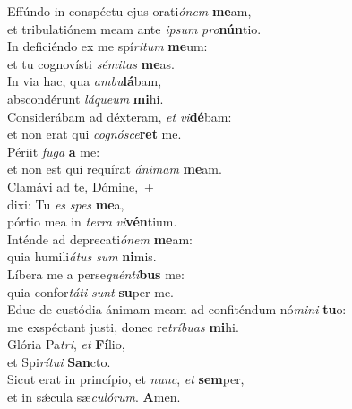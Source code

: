 \evenverse Effúndo in conspéctu ejus orati\textit{ó}\textit{nem} \textbf{me}am,~\*\\
\evenverse et tribulatiónem meam ante \textit{i}\textit{psum} \textit{pro}\textbf{nún}tio.\\
\oddverse In deficiéndo ex me spí\textit{ri}\textit{tum} \textbf{me}um:~\*\\
\oddverse et tu cognovísti \textit{sé}\textit{mi}\textit{tas} \textbf{me}as.\\
\evenverse In via hac, qua \textit{am}\textit{bu}\textbf{lá}bam,~\*\\
\evenverse abscondérunt \textit{lá}\textit{que}\textit{um} \textbf{mi}hi.\\
\oddverse Considerábam ad déxteram, \textit{et} \textit{vi}\textbf{dé}bam:~\*\\
\oddverse et non erat qui \textit{co}\textit{gnó}\textit{sce}\textbf{ret} me.\\
\evenverse Périit \textit{fu}\textit{ga} \textbf{a} me:~\*\\
\evenverse et non est qui requírat \textit{á}\textit{ni}\textit{mam} \textbf{me}am.\\
\oddverse Clamávi ad te, Dómine,~+\\
\oddverse  dixi: Tu \textit{es} \textit{spes} \textbf{me}a,~\*\\
\oddverse pórtio mea in \textit{ter}\textit{ra} \textit{vi}\textbf{vén}tium.\\
\evenverse Inténde ad deprecati\textit{ó}\textit{nem} \textbf{me}am:~\*\\
\evenverse quia humili\textit{á}\textit{tus} \textit{sum} \textbf{ni}mis.\\
\oddverse Líbera me a perse\textit{quén}\textit{ti}\textbf{bus} me:~\*\\
\oddverse quia confor\textit{tá}\textit{ti} \textit{sunt} \textbf{su}per me.\\
\evenverse Educ de custódia ánimam meam ad confiténdum nó\textit{mi}\textit{ni} \textbf{tu}o:~\*\\
\evenverse me exspéctant justi, donec re\textit{trí}\textit{bu}\textit{as} \textbf{mi}hi.\\
\oddverse Glória Pa\textit{tri}, \textit{et} \textbf{Fí}lio,~\*\\
\oddverse et Spi\textit{rí}\textit{tu}\textit{i} \textbf{San}cto.\\
\evenverse Sicut erat in princípio, et \textit{nunc}, \textit{et} \textbf{sem}per,~\*\\
\evenverse et in sǽcula sæ\textit{cu}\textit{ló}\textit{rum}. \textbf{A}men.\\
